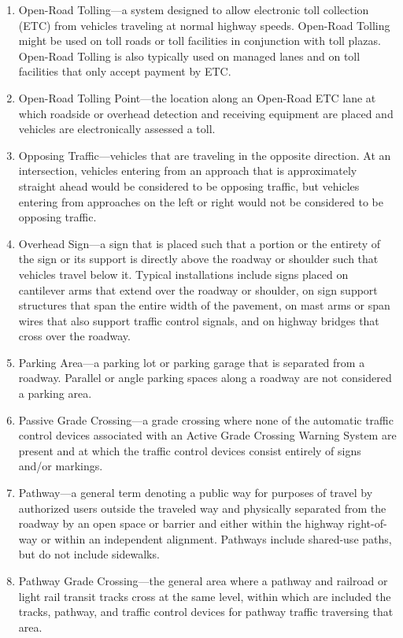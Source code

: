 \documentclass[9pt]{memoir}
\begin{document}
{\begin{enumerate}[label=\arabic*., ref=\arabic*]
\item Open-Road Tolling---a system designed to allow electronic toll collection (ETC) from vehicles traveling at normal highway speeds. Open-Road Tolling might be used on toll roads or toll facilities in conjunction with toll plazas. Open-Road Tolling is also typically used on managed lanes and on toll facilities that only accept payment by ETC.
\item Open-Road Tolling Point---the location along an Open-Road ETC lane at which roadside or overhead detection and receiving equipment are placed and vehicles are electronically assessed a toll.
\item Opposing Traffic---vehicles that are traveling in the opposite direction. At an intersection, vehicles entering from an approach that is approximately straight ahead would be considered to be opposing traffic, but vehicles entering from approaches on the left or right would not be considered to be opposing traffic.
\item Overhead Sign---a sign that is placed such that a portion or the entirety of the sign or its support is directly above the roadway or shoulder such that vehicles travel below it. Typical installations include signs placed on cantilever arms that extend over the roadway or shoulder, on sign support structures that span the entire width of the pavement, on mast arms or span wires that also support traffic control signals, and on highway bridges that cross over the roadway.
\item Parking Area---a parking lot or parking garage that is separated from a roadway. Parallel or angle parking spaces along a roadway are not considered a parking area.
\item Passive Grade Crossing---a grade crossing where none of the automatic traffic control devices associated with an Active Grade Crossing Warning System are present and at which the traffic control devices consist entirely of signs and/or markings.
\item Pathway---a general term denoting a public way for purposes of travel by authorized users outside the traveled way and physically separated from the roadway by an open space or barrier and either within the highway right-of-way or within an independent alignment. Pathways include shared-use paths, but do not include sidewalks.
\item Pathway Grade Crossing---the general area where a pathway and railroad or light rail transit tracks cross at the same level, within which are included the tracks, pathway, and traffic control devices for pathway traffic traversing that area.

\end{enumerate}}
\end{document}
